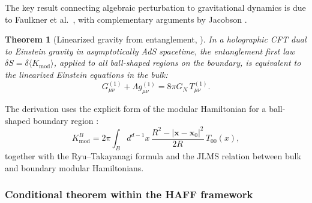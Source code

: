 \documentclass[12pt,a4paper]{article}
\newtheorem{theorem}{Theorem}[section]
\begin{document}
The key result connecting algebraic perturbation to gravitational dynamics is due to Faulkner et al.\ \cite{Faulkner2014}, with complementary arguments by Jacobson \cite{Jacobson2016}.

\begin{theorem}[Linearized gravity from entanglement, {\cite{Faulkner2014}}]
\label{thm:linearized-Faulkner}
In a holographic CFT dual to Einstein gravity in asymptotically AdS spacetime, the entanglement first law $\delta S = \delta\langle K_{\mathrm{mod}}\rangle$, applied to all ball-shaped regions on the boundary, is equivalent to the linearized Einstein equations in the bulk:
\begin{equation}
G_{\mu\nu}^{(1)} + \Lambda g_{\mu\nu}^{(1)} = 8\pi G_N\, T_{\mu\nu}^{(1)}.
\end{equation}
\end{theorem}

The derivation uses the explicit form of the modular Hamiltonian for a ball-shaped boundary region \cite{CasiniHuertaMyers2011}:
\begin{equation}
K_{\mathrm{mod}}^B = 2\pi \int_B d^{d-1}x\, \frac{R^2 - |\mathbf{x} - \mathbf{x}_0|^2}{2R}\, T_{00}(x),
\end{equation}
together with the Ryu--Takayanagi formula and the JLMS relation \cite{JLMS2016} between bulk and boundary modular Hamiltonians.

\subsubsection{Conditional theorem within the HAFF framework}
\end{document}
